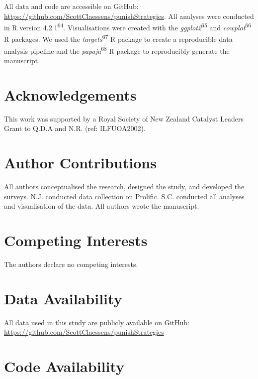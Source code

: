 \documentclass[
  man,floatsintext]{apa6}
\begin{document}
All data and code are accessible on GitHub:
\url{https://github.com/ScottClaessens/punishStrategies}. All analyses were conducted
in R version 4.2.1\textsuperscript{64}. Visualisations were created with the \emph{ggplot2}\textsuperscript{65} and \emph{cowplot}\textsuperscript{66} R packages. We used the \emph{targets}\textsuperscript{67} R package to create a reproducible data analysis pipeline and the
\emph{papaja}\textsuperscript{68} R package to reproducibly generate the manuscript.

\newpage
\nolinenumbers

\hypertarget{acknowledgements}{%
\section{Acknowledgements}\label{acknowledgements}}

This work was supported by a Royal Society of New Zealand Catalyst Leaders Grant
to Q.D.A and N.R. (ref: ILFUOA2002).

\hypertarget{author-contributions}{%
\section{Author Contributions}\label{author-contributions}}

All authors conceptualised the research, designed the study, and developed the
surveys. N.J. conducted data collection on Prolific. S.C. conducted all analyses
and visualisation of the data. All authors wrote the manuscript.

\hypertarget{competing-interests}{%
\section{Competing Interests}\label{competing-interests}}

The authors declare no competing interests.

\hypertarget{data-availability}{%
\section{Data Availability}\label{data-availability}}

All data used in this study are publicly available on GitHub:
\url{https://github.com/ScottClaessens/punishStrategies}

\hypertarget{code-availability}{%
\section{Code Availability}\label{code-availability}}
\end{document}

